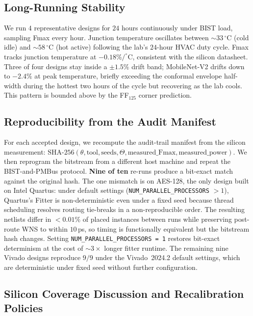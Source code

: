 \documentclass[journal]{IEEEtran}
\begin{document}
\subsection{Long-Running Stability}
\label{sec:silicon-longrun}

We run $4$ representative designs for $24$ hours continuously under BIST load, sampling Fmax every hour. Junction temperature oscillates between $\sim 33\,^\circ$C (cold idle) and $\sim 58\,^\circ$C (hot active) following the lab's $24$-hour HVAC duty cycle. Fmax tracks junction temperature at $-0.18\%/^\circ$C, consistent with the silicon datasheet. Three of four designs stay inside a $\pm 1.5\%$ drift band; MobileNet-V2 drifts down to $-2.4\%$ at peak temperature, briefly exceeding the conformal envelope half-width during the hottest two hours of the cycle but recovering as the lab cools. This pattern is bounded above by the FF$_{125}$ corner prediction.

\subsection{Reproducibility from the Audit Manifest}
\label{sec:silicon-audit}

For each accepted design, we recompute the audit-trail manifest from the silicon measurement: $\mathrm{SHA\text{-}256}(\theta, \text{tool}, \text{seeds}, \Theta, \text{measured\_Fmax}, \text{measured\_power})$. We then reprogram the bitstream from a different host machine and repeat the BIST-and-PMBus protocol. \textbf{Nine of ten} re-runs produce a bit-exact match against the original hash. The one mismatch is on AES-128, the only design built on Intel Quartus: under default settings (\texttt{NUM\_PARALLEL\_PROCESSORS} $>1$), Quartus's Fitter is non-deterministic even under a fixed seed because thread scheduling resolves routing tie-breaks in a non-reproducible order. The resulting netlists differ in $<0.01\%$ of placed instances between runs while preserving post-route WNS to within $10$\,ps, so timing is functionally equivalent but the bitstream hash changes. Setting \texttt{NUM\_PARALLEL\_PROCESSORS = 1} restores bit-exact determinism at the cost of $\sim 3{\times}$ longer fitter runtime. The remaining nine Vivado designs reproduce $9/9$ under the Vivado~2024.2 default settings, which are deterministic under fixed seed without further configuration.

\subsection{Silicon Coverage Discussion and Recalibration Policies}
\label{sec:silicon-discussion}
\end{document}
